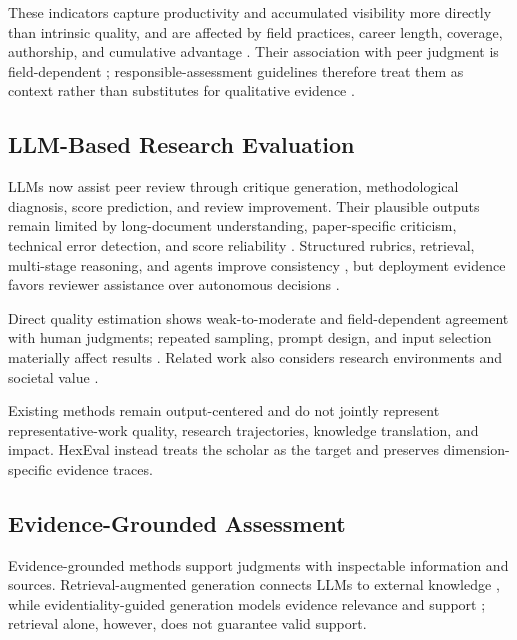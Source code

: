 \documentclass[letterpaper]{article} %
\begin{document}
These indicators capture productivity and accumulated visibility more directly than intrinsic quality, and are affected by field practices, career length, coverage, authorship, and cumulative advantage \cite{merton1968matthew,hicks2015leiden}. Their association with peer judgment is field-dependent \cite{wainer2013correlations,thelwall2023fields}; responsible-assessment guidelines therefore treat them as context rather than substitutes for qualitative evidence \cite{hicks2015leiden,pontika2022indicators}.

\subsection{LLM-Based Research Evaluation}

LLMs now assist peer review through critique generation, methodological diagnosis, score prediction, and review improvement. Their plausible outputs remain limited by long-document understanding, paper-specific criticism, technical error detection, and score reliability \cite{zhou2024reliable,du2024critique}. Structured rubrics, retrieval, multi-stage reasoning, and agents improve consistency \cite{jin2024agentreview,zhu2025deepreview}, but deployment evidence favors reviewer assistance over autonomous decisions \cite{thakkar2025canlf}.

Direct quality estimation shows weak-to-moderate and field-dependent agreement with human judgments; repeated sampling, prompt design, and input selection materially affect results \cite{thelwall2024chatgpt,thelwall2025evaluating,thelwall2024inwhich}. Related work also considers research environments and societal value \cite{kousha2025chatgpt,nunkoo2026globalsouth}.

Existing methods remain output-centered and do not jointly represent representative-work quality, research trajectories, knowledge translation, and impact. HexEval instead treats the scholar as the target and preserves dimension-specific evidence traces.

\subsection{Evidence-Grounded Assessment}

Evidence-grounded methods support judgments with inspectable information and sources. Retrieval-augmented generation connects LLMs to external knowledge \cite{lewis2020retrieval}, while evidentiality-guided generation models evidence relevance and support \cite{asai2022evidentiality}; retrieval alone, however, does not guarantee valid support.
\end{document}
